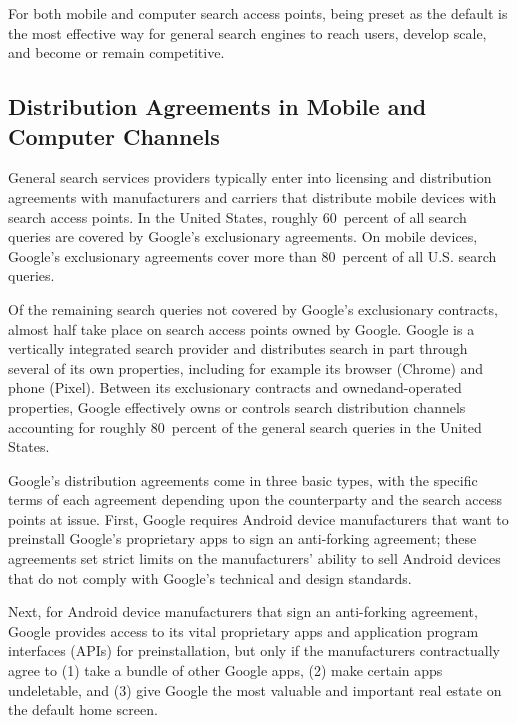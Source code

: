 \documentclass[11pt,b5paper,headings=small]{scrartcl}
\begin{document}

For both mobile and computer search access points, being preset as the default is
the most effective way for general search engines to reach users, develop scale, and become or
remain competitive.

\subsection{
Distribution Agreements in Mobile and Computer Channels}


General search services providers typically enter into licensing and distribution
agreements with manufacturers and carriers that distribute mobile devices with search access
points. In the United States, roughly 60~percent of all search queries are covered by Google’s
exclusionary agreements. On mobile devices, Google’s exclusionary agreements cover more than
80~percent of all U.S. search queries.


Of the remaining search queries not covered by Google’s exclusionary contracts,
almost half take place on search access points owned by Google. Google is a vertically integrated
search provider and distributes search in part through several of its own properties, including for
example its browser (Chrome) and phone (Pixel). Between its exclusionary contracts and ownedand-operated properties, Google effectively owns or controls search distribution channels
accounting for roughly 80~percent of the general search queries in the United States.


Google’s distribution agreements come in three basic types, with the specific
terms of each agreement depending upon the counterparty and the search access points at issue.
First, Google requires Android device manufacturers that want to preinstall Google’s proprietary
apps to sign an anti-forking agreement; these agreements set strict limits on the manufacturers’
ability to sell Android devices that do not comply with Google’s technical and design standards.


Next, for Android device manufacturers that sign an anti-forking agreement,
Google provides access to its vital proprietary apps and application program interfaces (APIs) for
preinstallation, but only if the manufacturers contractually agree to (1) take a bundle of other
Google apps, (2) make certain apps undeletable, and (3) give Google the most valuable and
important real estate on the default home screen.
\end{document}
